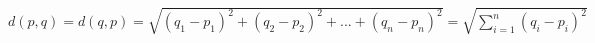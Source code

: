 \documentclass[preview]{standalone}\usepackage[english]{babel}\usepackage{amsmath}\usepackage{amssymb}\usepackage{dsfont}\usepackage{setspace}\usepackage{tipa}\usepackage{relsize}\usepackage{textcomp}\usepackage{mathrsfs}\usepackage{calligra}\usepackage{wasysym}\usepackage{ragged2e}\usepackage{physics}\usepackage{xcolor}\usepackage{microtype}\linespread{1}
\begin{document}
$d\left(p, q\right)=d\left(q, p\right)=\sqrt{(q_1-p_1)^2+(q_2-p_2)^2+...+(q_n-p_n)^2}=\sqrt{\sum_{i=1}^n\left(q_i-p_i\right)^2}$
\end{document}
